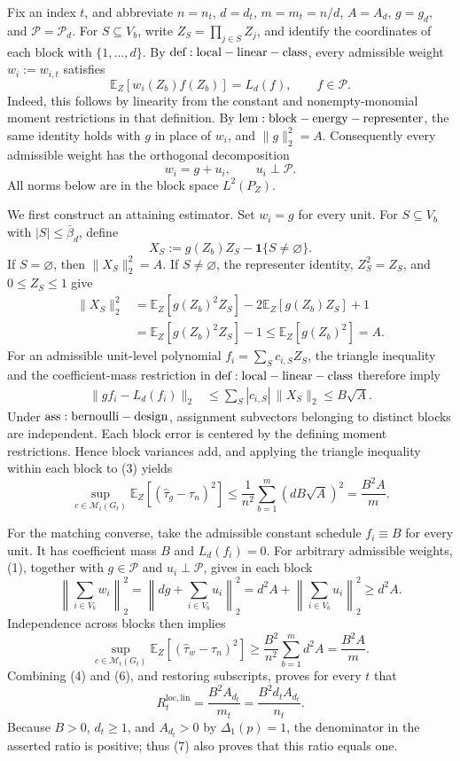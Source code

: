 Fix an index \(t\), and abbreviate \(n=n_t\), \(d=d_t\), \(m=m_t=n/d\), \(A=A_d\), \(g=g_d\), and \(\mathcal P=\mathcal P_d\). For \(S\subseteq V_b\), write \(Z_S=\prod_{j\in S}Z_j\), and identify the coordinates of each block with \(\{1,\ldots,d\}\). By \({\rm def:local-linear-class}\), every admissible weight \(w_i:=w_{i,t}\) satisfies
\[
\mathbb E_Z[w_i(Z_b)f(Z_b)]=L_d(f),\qquad f\in\mathcal P.
\]
Indeed, this follows by linearity from the constant and nonempty-monomial moment restrictions in that definition. By \({\rm lem:block-energy-representer}\), the same identity holds with \(g\) in place of \(w_i\), and \(\lVert g\rVert_2^2=A\). Consequently every admissible weight has the orthogonal decomposition
\[
w_i=g+u_i,\qquad u_i\perp\mathcal P.
\tag{1}
\]
All norms below are in the block space \(L^2(P_Z)\).

We first construct an attaining estimator. Set \(w_i=g\) for every unit. For \(S\subseteq V_b\) with \(|S|\le\bar\beta_d\), define
\[
X_S:=g(Z_b)Z_S-\mathbf 1\{S\ne\varnothing\}.
\]
If \(S=\varnothing\), then \(\lVert X_S\rVert_2^2=A\). If \(S\ne\varnothing\), the representer identity, \(Z_S^2=Z_S\), and \(0\le Z_S\le1\) give
\[
\begin{aligned}
\lVert X_S\rVert_2^2
&=\mathbb E_Z[g(Z_b)^2Z_S]-2\mathbb E_Z[g(Z_b)Z_S]+1\\
&=\mathbb E_Z[g(Z_b)^2Z_S]-1
\le \mathbb E_Z[g(Z_b)^2]=A.
\end{aligned}
\tag{2}
\]
For an admissible unit-level polynomial \(f_i=\sum_Sc_{i,S}Z_S\), the triangle inequality and the coefficient-mass restriction in \({\rm def:local-linear-class}\) therefore imply
\[
\begin{aligned}
\lVert gf_i-L_d(f_i)\rVert_2
&\le\sum_S|c_{i,S}|\,\lVert X_S\rVert_2
\le B\sqrt A.
\end{aligned}
\tag{3}
\]
Under \({\rm ass:bernoulli-design}\), assignment subvectors belonging to distinct blocks are independent. Each block error is centered by the defining moment restrictions. Hence block variances add, and applying the triangle inequality within each block to (3) yields
\[
\sup_{c\in\mathcal M_t(G_t)}
\mathbb E_Z[(\widehat\tau_g-\tau_n)^2]
\le \frac1{n^2}\sum_{b=1}^m(dB\sqrt A)^2
=\frac{B^2A}{m}.
\tag{4}
\]

For the matching converse, take the admissible constant schedule \(f_i\equiv B\) for every unit. It has coefficient mass \(B\) and \(L_d(f_i)=0\). For arbitrary admissible weights, (1), together with \(g\in\mathcal P\) and \(u_i\perp\mathcal P\), gives in each block
\[
\left\lVert\sum_{i\in V_b}w_i\right\rVert_2^2
=\left\lVert dg+\sum_{i\in V_b}u_i\right\rVert_2^2
=d^2A+\left\lVert\sum_{i\in V_b}u_i\right\rVert_2^2
\ge d^2A.
\tag{5}
\]
Independence across blocks then implies
\[
\sup_{c\in\mathcal M_t(G_t)}
\mathbb E_Z[(\widehat\tau_w-\tau_n)^2]
\ge\frac{B^2}{n^2}\sum_{b=1}^m d^2A
=\frac{B^2A}{m}.
\tag{6}
\]
Combining (4) and (6), and restoring subscripts, proves for every \(t\) that
\[
R_t^{\mathrm{loc,lin}}=\frac{B^2A_{d_t}}{m_t}
=\frac{B^2d_tA_{d_t}}{n_t}.
\tag{7}
\]
Because \(B>0\), \(d_t\ge1\), and \(A_{d_t}>0\) by \(\Delta_1(p)=1\), the denominator in the asserted ratio is positive; thus (7) also proves that this ratio equals one.

